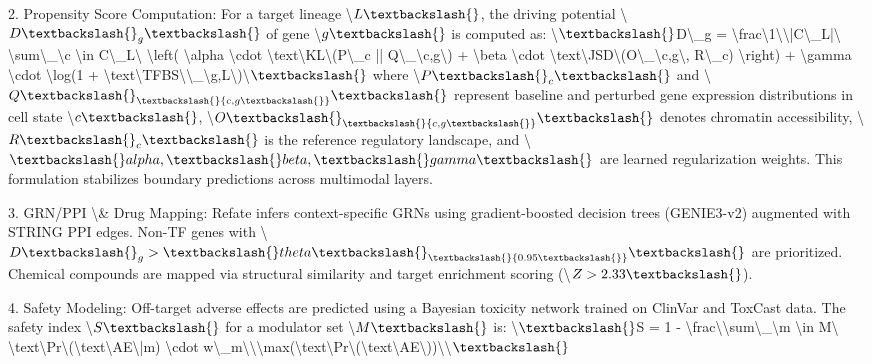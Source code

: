 \documentclass[11pt,a4paper]{article}
\begin{document}
2. Propensity Score Computation: For a target lineage \textbackslash{}$L\textbackslash{}$, the driving potential \textbackslash{}$D\textbackslash{}_g\textbackslash{}$ of gene \textbackslash{}$g\textbackslash{}$ is computed as:
\textbackslash{}$\textbackslash{}$D\textbackslash{}_g = \textbackslash{}frac\textbackslash{}{1\textbackslash{}}\textbackslash{}{|C\textbackslash{}_L|\textbackslash{}} \textbackslash{}sum\textbackslash{}_\textbackslash{}{c \textbackslash{}in C\textbackslash{}_L\textbackslash{}} \textbackslash{}left( \textbackslash{}alpha \textbackslash{}cdot \textbackslash{}text\textbackslash{}{KL\textbackslash{}}(P\textbackslash{}_c || Q\textbackslash{}_\textbackslash{}{c,g\textbackslash{}}) + \textbackslash{}beta \textbackslash{}cdot \textbackslash{}text\textbackslash{}{JSD\textbackslash{}}(O\textbackslash{}_\textbackslash{}{c,g\textbackslash{}}, R\textbackslash{}_c) \textbackslash{}right) + \textbackslash{}gamma \textbackslash{}cdot \textbackslash{}log(1 + \textbackslash{}text\textbackslash{}{TFBS\textbackslash{}}\textbackslash{}_\textbackslash{}{g,L\textbackslash{}})\textbackslash{}$\textbackslash{}$
where \textbackslash{}$P\textbackslash{}_c\textbackslash{}$ and \textbackslash{}$Q\textbackslash{}_\textbackslash{}{c,g\textbackslash{}}\textbackslash{}$ represent baseline and perturbed gene expression distributions in cell state \textbackslash{}$c\textbackslash{}$, \textbackslash{}$O\textbackslash{}_\textbackslash{}{c,g\textbackslash{}}\textbackslash{}$ denotes chromatin accessibility, \textbackslash{}$R\textbackslash{}_c\textbackslash{}$ is the reference regulatory landscape, and \textbackslash{}$\textbackslash{}alpha, \textbackslash{}beta, \textbackslash{}gamma\textbackslash{}$ are learned regularization weights. This formulation stabilizes boundary predictions across multimodal layers.

3. GRN/PPI \textbackslash{}& Drug Mapping: Refate infers context-specific GRNs using gradient-boosted decision trees (GENIE3-v2) augmented with STRING PPI edges. Non-TF genes with \textbackslash{}$D\textbackslash{}_g > \textbackslash{}theta\textbackslash{}_\textbackslash{}{0.95\textbackslash{}}\textbackslash{}$ are prioritized. Chemical compounds are mapped via structural similarity and target enrichment scoring (\textbackslash{}$Z > 2.33\textbackslash{}$).

4. Safety Modeling: Off-target adverse effects are predicted using a Bayesian toxicity network trained on ClinVar and ToxCast data. The safety index \textbackslash{}$S\textbackslash{}$ for a modulator set \textbackslash{}$M\textbackslash{}$ is:
\textbackslash{}$\textbackslash{}$S = 1 - \textbackslash{}frac\textbackslash{}{\textbackslash{}sum\textbackslash{}_\textbackslash{}{m \textbackslash{}in M\textbackslash{}} \textbackslash{}text\textbackslash{}{Pr\textbackslash{}}(\textbackslash{}text\textbackslash{}{AE\textbackslash{}}|m) \textbackslash{}cdot w\textbackslash{}_m\textbackslash{}}\textbackslash{}{\textbackslash{}max(\textbackslash{}text\textbackslash{}{Pr\textbackslash{}}(\textbackslash{}text\textbackslash{}{AE\textbackslash{}}))\textbackslash{}}\textbackslash{}$\textbackslash{}$
\end{document}
